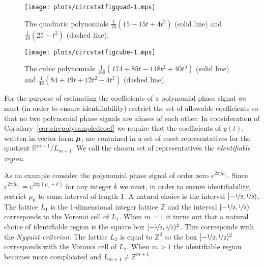 \documentclass[aap]{imsart}
\newcommand{\reals}{{\mathbb R}}
\newcommand{\ints}{{\mathbb Z}}
\newcommand{\term}{\emph}
\begin{document}
\begin{figure}[p]
	\centering
		\texttt{[image: plots/circstatfigquad-1.mps]}
		\caption{The quadratic polynomials $\tfrac{1}{10} (15 - 15 t + 4 t^2)$ (solid line) and $\tfrac{1}{10}(25 -  t^2)$  (dashed line).}
		\label{fig:circstatplot_quad}
\end{figure}

\begin{figure}[p]
	\centering
		\texttt{[image: plots/circstatfigcube-1.mps]}
		\caption{The cubic polynomials $\tfrac{1}{160} (174 + 85 t - 118 t^2 + 40 t^3)$ (solid line) and $\tfrac{1}{48} (84 + 19 t + 12 t^2 - 4 t^3)$  (dashed line).}
		\label{fig:circstatplot_cube}
\end{figure}

For the purpose of estimating the coefficients of a polynomial phase signal we must (in order to ensure identifiability) restrict the set of allowable coefficients so that no two polynomial phase signals are aliases of each other. In consideration of Corollary~\ref{cor:circpolysampledcoef} we require that the coefficients of $y(t)$, written in vector form $\boldsymbol{\mu}$, are contained in a set of coset representatives for the quotient $\reals^{m+1}/L_{m+1}$.  We call the chosen set of representatives the \term{identifiable region}.

As an example consider the polynomial phase signal of order zero $e^{2\pi j \mu_0}$.  Since $e^{2\pi j \mu_0} = e^{2\pi j(\mu_0 + k)}$ for any integer $k$ we must, in order to ensure identifiability, restrict $\mu_0$ to some interval of length $1$.  A natural choice is the interval $[-\nicefrac{1}{2}, \nicefrac{1}{2})$. The lattice $L_1$ is the 1-dimensional integer lattice $\ints$ and the interval $[-\nicefrac{1}{2}, \nicefrac{1}{2})$ corresponds to the Voronoi cell of $L_1$. 
When $m=1$ it turns out that a natural choice of identifiable region is the square box $[-\nicefrac{1}{2}, \nicefrac{1}{2})^2$. This corresponds with the \term{Nyquist criterion}.  The lattice $L_2$ is equal to $\ints^2$ so the box $[-\nicefrac{1}{2}, \nicefrac{1}{2})^2$ corresponds with the Voronoi cell of $L_2$.  
When $m > 1$ the identifiable region becomes more complicated and $L_{m+1} \neq \ints^{m+1}$. %
\end{document}

